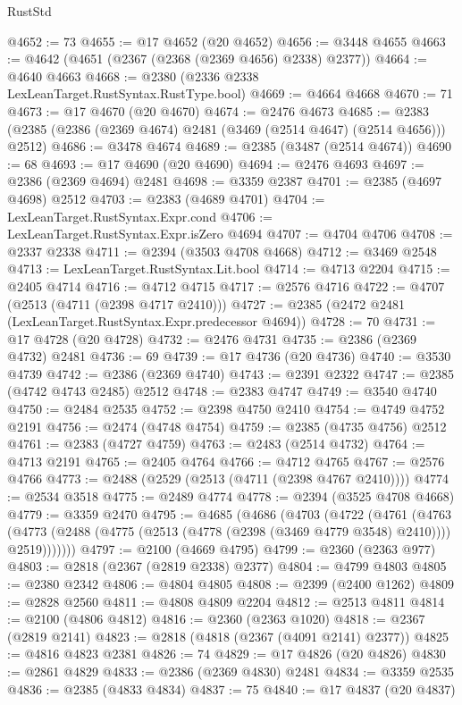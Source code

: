 \begin{lexlean}{RustStd}
\begin{coremodule}
@4652 := 73
@4655 := @17 @4652 (@20 @4652)
@4656 := @3448 @4655
@4663 := @4642 (@4651 (@2367 (@2368 (@2369 @4656) @2338) @2377))
@4664 := @4640 @4663
@4668 := @2380 (@2336 @2338 LexLeanTarget.RustSyntax.RustType.bool)
@4669 := @4664 @4668
@4670 := 71
@4673 := @17 @4670 (@20 @4670)
@4674 := @2476 @4673
@4685 := @2383 (@2385 (@2386 (@2369 @4674) @2481 (@3469 (@2514 @4647) (@2514 @4656))) @2512)
@4686 := @3478 @4674
@4689 := @2385 (@3487 (@2514 @4674))
@4690 := 68
@4693 := @17 @4690 (@20 @4690)
@4694 := @2476 @4693
@4697 := @2386 (@2369 @4694) @2481
@4698 := @3359 @2387
@4701 := @2385 (@4697 @4698) @2512
@4703 := @2383 (@4689 @4701)
@4704 := LexLeanTarget.RustSyntax.Expr.cond
@4706 := LexLeanTarget.RustSyntax.Expr.isZero @4694
@4707 := @4704 @4706
@4708 := @2337 @2338
@4711 := @2394 (@3503 @4708 @4668)
@4712 := @3469 @2548
@4713 := LexLeanTarget.RustSyntax.Lit.bool
@4714 := @4713 @2204
@4715 := @2405 @4714
@4716 := @4712 @4715
@4717 := @2576 @4716
@4722 := @4707 (@2513 (@4711 (@2398 @4717 @2410)))
@4727 := @2385 (@2472 @2481 (LexLeanTarget.RustSyntax.Expr.predecessor @4694))
@4728 := 70
@4731 := @17 @4728 (@20 @4728)
@4732 := @2476 @4731
@4735 := @2386 (@2369 @4732) @2481
@4736 := 69
@4739 := @17 @4736 (@20 @4736)
@4740 := @3530 @4739
@4742 := @2386 (@2369 @4740)
@4743 := @2391 @2322
@4747 := @2385 (@4742 @4743 @2485) @2512
@4748 := @2383 @4747
@4749 := @3540 @4740
@4750 := @2484 @2535
@4752 := @2398 @4750 @2410
@4754 := @4749 @4752 @2191
@4756 := @2474 (@4748 @4754)
@4759 := @2385 (@4735 @4756) @2512
@4761 := @2383 (@4727 @4759)
@4763 := @2483 (@2514 @4732)
@4764 := @4713 @2191
@4765 := @2405 @4764
@4766 := @4712 @4765
@4767 := @2576 @4766
@4773 := @2488 (@2529 (@2513 (@4711 (@2398 @4767 @2410))))
@4774 := @2534 @3518
@4775 := @2489 @4774
@4778 := @2394 (@3525 @4708 @4668)
@4779 := @3359 @2470
@4795 := @4685
    (@4686
      (@4703
        (@4722
          (@4761
            (@4763
              (@4773 (@2488 (@4775 (@2513 (@4778 (@2398 (@3469 @4779 @3548) @2410)))) @2519)))))))
@4797 := @2100 (@4669 @4795)
@4799 := @2360 (@2363 @977)
@4803 := @2818 (@2367 (@2819 @2338) @2377)
@4804 := @4799 @4803
@4805 := @2380 @2342
@4806 := @4804 @4805
@4808 := @2399 (@2400 @1262)
@4809 := @2828 @2560
@4811 := @4808 @4809 @2204
@4812 := @2513 @4811
@4814 := @2100 (@4806 @4812)
@4816 := @2360 (@2363 @1020)
@4818 := @2367 (@2819 @2141)
@4823 := @2818 (@4818 (@2367 (@4091 @2141) @2377))
@4825 := @4816 @4823 @2381
@4826 := 74
@4829 := @17 @4826 (@20 @4826)
@4830 := @2861 @4829
@4833 := @2386 (@2369 @4830) @2481
@4834 := @3359 @2535
@4836 := @2385 (@4833 @4834)
@4837 := 75
@4840 := @17 @4837 (@20 @4837)

\end{coremodule}
\end{lexlean}
